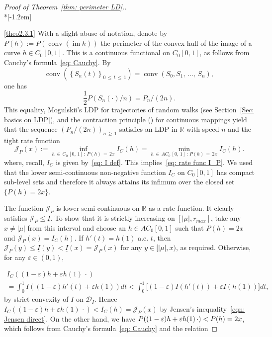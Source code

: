 \documentclass[AHL,Unicode,published]{cedram}
\DeclareMathOperator{\conv}{conv}
\DeclareMathOperator{\im}{im}
\newcommand{\ubar}[1]{\underline{#1}}
\newcommand{\Rbb}{\mathbb{R}}
\newcommand{\Dcl}{\mathcal{D}}
\newcommand{\Jcl}{\mathcal{J}}
\begin{document}
\begin{proof}[Proof of Theorem~\ref{thm: perimeter LD}.]\ \\*[-1.2em]

\eqref{theo2.3.1} With a slight abuse of notation, denote by $P(h):= P(\conv(\im h))$ the perimeter of the convex hull of the image of a curve $h \in C_0[0,1]$. This is a continuous functional on $C_0[0,1]$, as follows from Cauchy's formula~\eqref{eq: Cauchy}. By
\begin{equation}\label{eq: conve hull}
\conv \left(\left\{S_n(t) \right\}_{0\,\le\,t\,\le\,1}\right)=\conv(S_0,S_1,\,\ldots,\,S_n),
\end{equation}
one has
\[
\frac12 P(S_n(\cdot)/n)= P_n/(2n).
\]
This equality, Mogulskii's LDP for trajectories of random walks (see Section~\ref{Sec: basics on LDP}), and the contraction principle (\cite[Theorem~4.2.1]{DemboZeitouni}) for continuous mappings yield that the sequence $(P_n/(2n))_{n\,\ge\,1}$ satisfies an LDP in $\Rbb$ with speed $n$ and the tight rate function
\begin{equation}\label{eq: rate function I_P}
\Jcl_P(x):=\inf_{h\,\in\,C_0\,[0,\,1]\,: \, P(h)\,=\,2x} I_C(h)=\min_{h\,\in\,AC_0\,[0,\,1]\,:\, P(h)\,=\,2x} I_C(h).
\end{equation}
where, recall, $I_C$ is given by~\eqref{eq: I def}. This implies~\eqref{eq: rate func I_P}. We used that the lower semi-continuous non-negative function $I_C$ on $C_0[0,1]$ has compact sub-level sets and therefore it always attains its infimum over the closed set $\{P(h)=2x\}$.

The function $\Jcl_P$ is lower semi-continuous on $\Rbb$ as a rate function. It clearly satisfies $\Jcl_P \leqslant \ubar I $. To show that it is strictly increasing on $[|\mu|, r_{max}]$, take any $x\neq |\mu|$ from this interval and choose an $h \in AC_0[0,1]$ such that $P(h)=2x$ and $\Jcl_P(x)=I_C(h)$. If $h'(t) =h(1)$ a.e. $t$, then $\Jcl_P(y) \le \ubar I(y) < \ubar I(x) = \Jcl_P(x)$ for any $y \in [|\mu|, x)$, as required. Otherwise, for any $\varepsilon \in (0,1)$,

\begin{multline*}
I_C((1-\varepsilon) h + \varepsilon h(1) \, \cdot)\\
= \int_0^1 I((1-\varepsilon) h'(t) + \varepsilon h(1)) dt < \int_0^1 \big [(1-\varepsilon) I(h'(t))+ \varepsilon I(h(1)) \big] dt,
\end{multline*}
by strict convexity of $I$ on $\Dcl_I$. Hence $I_C((1-\varepsilon) h + \varepsilon h(1) \, \cdot)< I_C(h) = \Jcl_P(x)$ by Jensen's inequality~\eqref{eqn: Jensen direct}. On the other hand, we have $P((1-\varepsilon) h + \varepsilon h(1) \,\cdot)\linebreak<P(h) =2x$, which follows from Cauchy's formula~\eqref{eq: Cauchy} and the relation


\end{proof}
\end{document}
